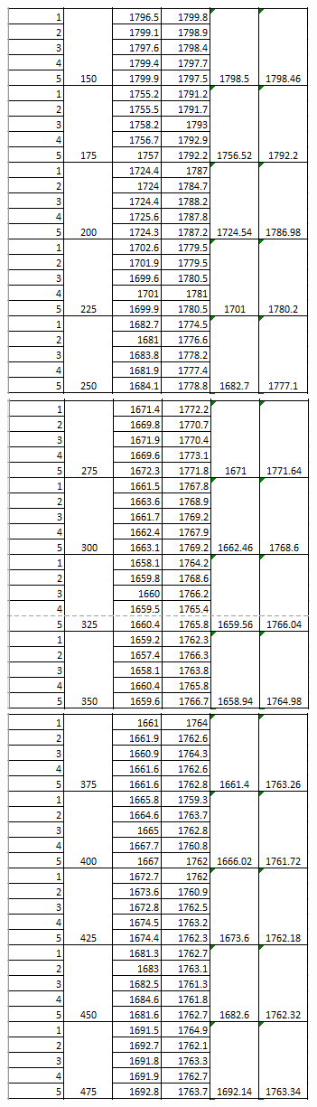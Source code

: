 \documentclass[12pt, a4paper]{article}
\begin{document}
\begin{enumerate}
\begin{center}
		\includegraphics[scale=1.25]{table2_1_24V.png}\\
		\includegraphics[scale=1.25]{table3_1_24V.png}\\
		\includegraphics[scale=1.25]{table4_1_24V.png}\\

\end{center}
\end{enumerate}
\end{document}
